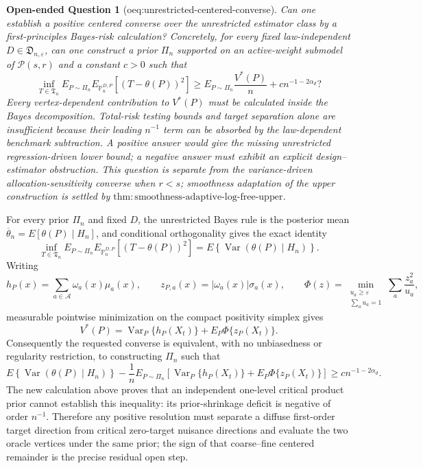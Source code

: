 \documentclass{article}
\newtheorem{openendedquestion}{Open-ended Question}
\begin{document}
\begin{openendedquestion}[oeq:unrestricted-centered-converse]\label{oeq:unrestricted-centered-converse}
Can one establish a positive centered converse over the unrestricted estimator class by a first-principles Bayes-risk calculation?  Concretely, for every fixed law-independent \(D\in\mathfrak D_{n,\varepsilon}\), can one construct a prior \(\Pi_n\) supported on an active-weight submodel of \(\mathcal P(s,r)\) and a constant \(c>0\) such that
\[
\inf_{T\in\mathfrak T_n}
E_{P\sim\Pi_n}E_{\mathbb P_n^{D,P}}[(T-\theta(P))^2]
\geq E_{P\sim\Pi_n}\frac{V^*(P)}n
+c n^{-1-2\alpha_d}?
\]
Every vertex-dependent contribution to \(V^*(P)\) must be calculated inside the Bayes decomposition.  Total-risk testing bounds and target separation alone are insufficient because their leading \(n^{-1}\) term can be absorbed by the law-dependent benchmark subtraction.  A positive answer would give the missing unrestricted regression-driven lower bound; a negative answer must exhibit an explicit design--estimator obstruction.  This question is separate from the variance-driven allocation-sensitivity converse when \(r<s\); smoothness adaptation of the upper construction is settled by \(\mathrm{thm{:}smoothness\text{-}adaptive\text{-}log\text{-}free\text{-}upper}\).
\end{openendedquestion}
For every prior \(\Pi_n\) and fixed \(D\), the unrestricted Bayes rule is the posterior mean \(\overline\theta_n=E[\theta(P)\mid H_n]\), and conditional orthogonality gives the exact identity
\[
\inf_{T\in\mathfrak T_n}
E_{P\sim\Pi_n}E_{\mathbb P_n^{D,P}}[(T-\theta(P))^2]
=E\!\left\{\operatorname{Var}(\theta(P)\mid H_n)\right\}.
\]
Writing
\[
h_P(x)=\sum_{a\in\mathcal A}\omega_a(x)\mu_a(x),
\qquad
z_{P,a}(x)=|\omega_a(x)|\sigma_a(x),
\qquad
\Phi(z)=\min_{\substack{u_a\geq\varepsilon\\\sum_a u_a=1}}
\sum_a\frac{z_a^2}{u_a},
\]
measurable pointwise minimization on the compact positivity simplex gives
\[
V^*(P)=\operatorname{Var}_P\{h_P(X_t)\}+E_P\Phi\{z_P(X_t)\}.
\]
Consequently the requested converse is equivalent, with no unbiasedness or regularity restriction, to constructing \(\Pi_n\) such that
\[
E\!\left\{\operatorname{Var}(\theta(P)\mid H_n)\right\}
-\frac1nE_{P\sim\Pi_n}\!\left[
\operatorname{Var}_P\{h_P(X_t)\}+E_P\Phi\{z_P(X_t)\}
\right]
\geq c n^{-1-2\alpha_d}.
\]
The new calculation above proves that an independent one-level critical product prior cannot establish this inequality: its prior-shrinkage deficit is negative of order \(n^{-1}\).  Therefore any positive resolution must separate a diffuse first-order target direction from critical zero-target nuisance directions and evaluate the two oracle vertices under the same prior; the sign of that coarse--fine centered remainder is the precise residual open step.
\end{document}
